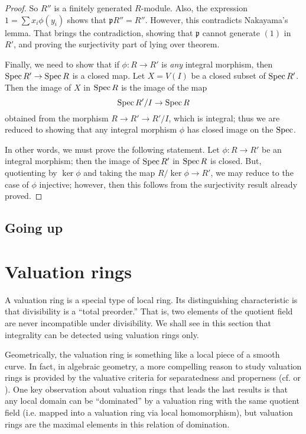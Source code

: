 \begin{proof}
So $R''$ is a finitely generated $R$-module. Also, the expression
$1 = \sum x_i \phi(y_i)$ shows that $\mathfrak{p}R'' = R''$. However, this
contradicts Nakayama's lemma. That brings the contradiction, showing that
$\mathfrak{p}$ cannot generate $(1)$ in $R'$, and proving the surjectivity
part of  lying over theorem.

Finally, we need to show that if $\phi: R \to R'$ is \emph{any} integral
morphism, then $\operatorname{Spec} R' \to \operatorname{Spec} R$ is a closed map. Let $X = V(I) $ be a
closed subset of $\operatorname{Spec} R'$. Then the image of $X$ in $\operatorname{Spec} R$ is the image
of the map
\[ \operatorname{Spec} R'/I \to \operatorname{Spec} R   \]
obtained from the morphism $R \to R' \to  R'/I$, which is integral; thus we are
reduced to showing that any integral morphism $\phi$ has closed image on the
$\operatorname{Spec}$. 


In other words, we must prove the following statement. Let $\phi: R \to R'$ be
an integral morphism; then the image of $\operatorname{Spec} R'$ in $\operatorname{Spec} R$ is closed.
But, quotienting by $\ker \phi$ and taking the map $R/\ker \phi \to R'$, we
may reduce to the case of $\phi$ injective; however, then this follows from
the surjectivity result already proved.
\end{proof}

\subsection{Going up}




\section{Valuation rings}

A valuation ring is a special type of local ring. Its distinguishing
characteristic is that divisibility is a ``total preorder.'' That is, two
elements of the quotient field are never incompatible under divisibility.
 We shall see in this section that integrality can be detected using
valuation rings only.

Geometrically, the valuation ring is something like a local piece of a smooth
curve. In fact, in algebraic geometry, a more compelling reason to study
valuation rings is provided by the valuative criteria for separatedness and
properness (cf. \cite{EGA} or \cite{Ha77}).  One key observation about
valuation rings that leads the last results is that any local domain can be
``dominated'' by a valuation ring with the same quotient field (i.e. mapped
into a valuation ring via local
homomorphism), but valuation rings are the maximal elements in this relation
of domination.

